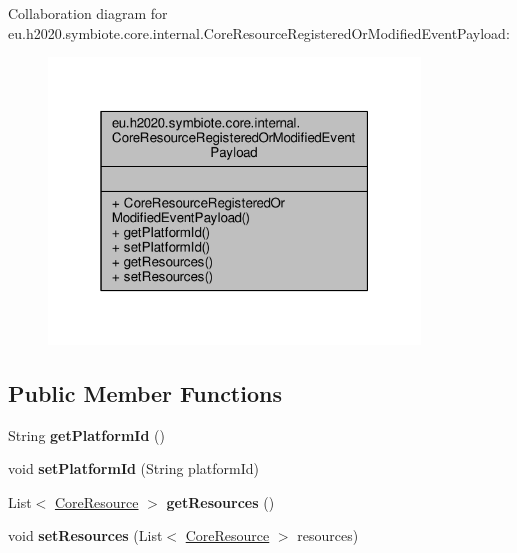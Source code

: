 Collaboration diagram for eu.\+h2020.\+symbiote.\+core.\+internal.\+Core\+Resource\+Registered\+Or\+Modified\+Event\+Payload\+:\nopagebreak
\begin{figure}[H]
\begin{center}
\leavevmode
\includegraphics[width=280pt]{classeu_1_1h2020_1_1symbiote_1_1core_1_1internal_1_1CoreResourceRegisteredOrModifiedEventPayload__coll__graph}
\end{center}
\end{figure}
\subsection*{Public Member Functions}
\begin{DoxyCompactItemize}
\item 
\mbox{\label{classeu_1_1h2020_1_1symbiote_1_1core_1_1internal_1_1CoreResourceRegisteredOrModifiedEventPayload_ab4e4f2f9c2af9b767ec0a98dbee24788}} 
String {\bfseries get\+Platform\+Id} ()
\item 
\mbox{\label{classeu_1_1h2020_1_1symbiote_1_1core_1_1internal_1_1CoreResourceRegisteredOrModifiedEventPayload_a05af9348039ffae8f14c7b78e5ecc008}} 
void {\bfseries set\+Platform\+Id} (String platform\+Id)
\item 
\mbox{\label{classeu_1_1h2020_1_1symbiote_1_1core_1_1internal_1_1CoreResourceRegisteredOrModifiedEventPayload_a91a810ad8a7b89a7b6c849ac24d983da}} 
List$<$ \hyperlink{classeu_1_1h2020_1_1symbiote_1_1core_1_1internal_1_1CoreResource}{Core\+Resource} $>$ {\bfseries get\+Resources} ()
\item 
\mbox{\label{classeu_1_1h2020_1_1symbiote_1_1core_1_1internal_1_1CoreResourceRegisteredOrModifiedEventPayload_a13bd56894bf91b3767a6d5cfa25248c6}} 
void {\bfseries set\+Resources} (List$<$ \hyperlink{classeu_1_1h2020_1_1symbiote_1_1core_1_1internal_1_1CoreResource}{Core\+Resource} $>$ resources)
\end{DoxyCompactItemize}


